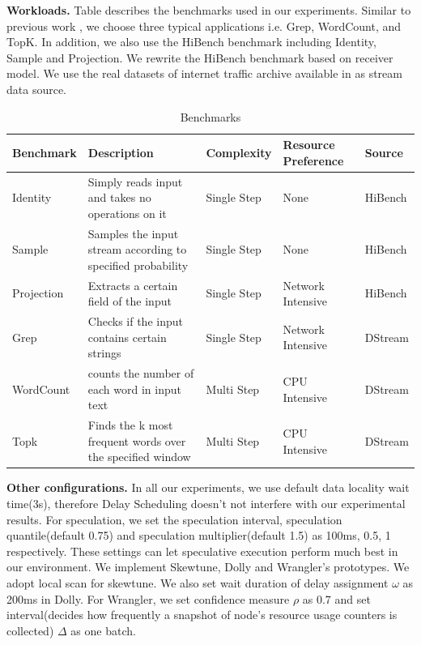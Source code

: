   \textbf{Workloads.} Table \uppercase\expandafter{} describes the benchmarks used in our experiments. Similar to previous work \cite{Zaharia2013}, we choose three typical applications i.e. Grep, WordCount, and TopK. In addition, we also use the HiBench \cite{HiBench} benchmark including Identity, Sample and Projection. We rewrite the HiBench \cite{HiBench} benchmark based on receiver model. We use the real datasets of internet traffic archive available in \cite{datasets} as stream data source.
  \begin{table}[htbp]
    \footnotesize
    \centering
    \caption{Benchmarks}
    \begin{threeparttable}
    \centering
      \begin{tabular}{|p{1.4cm}|p{7.2cm}|p{1.5cm}|p{2.8cm}|p{1.7cm}|}
        \hline
        \centering
        \textbf{Benchmark} & \textbf{Description} & \textbf{Complexity} & \textbf{Resource Preference} & \textbf{Source} \\
        \hline
        Identity & Simply reads input and takes no operations on it & Single Step & None & HiBench \cite{HiBench} \\
        \hline
        Sample & Samples the input stream according to specified probability & Single Step & None & HiBench \cite{HiBench} \\
        \hline
        Projection & Extracts a certain field of the input & Single Step & Network Intensive & HiBench \cite{HiBench} \\
        \hline
        Grep & Checks if the input contains certain strings & Single Step & Network Intensive & DStream \cite{Zaharia2013} \\
        \hline
        WordCount & counts the number of each word in input text & Multi Step & CPU Intensive & DStream \cite{Zaharia2013} \\
        \hline
        Topk & Finds the k most frequent words over the specified window & Multi Step & CPU Intensive & DStream \cite{Zaharia2013} \\
        \hline
      \end{tabular}
    \end{threeparttable}
    \label{Table2}
  \end{table}

  \textbf{Other configurations.} In all our experiments, we use default data locality wait time(3s), therefore Delay Scheduling \cite{Zaharia2010B} doesn't not interfere with our experimental results. For speculation, we set the speculation interval, speculation quantile(default 0.75) and speculation multiplier(default 1.5) as 100ms, 0.5, 1 respectively. These settings can let speculative execution perform much best in our environment. We implement Skewtune, Dolly and Wrangler's prototypes. We adopt local scan for skewtune. We also set wait duration of delay assignment $\omega$ as 200ms in Dolly. For Wrangler, we set confidence measure $\rho$ as 0.7 and set interval(decides how frequently a snapshot of node's resource usage counters is collected) $\Delta$ as one batch.

